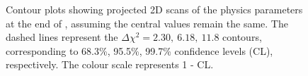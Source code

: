 \begin{figure}[h]
\centering
{}
\caption{Contour plots showing projected 2D scans of the physics parameters at the end of \runtwo, assuming the central values remain the same. The dashed lines represent the $\Delta \chi^2 = 2.30,\ 6.18,\ 11.8$ contours, corresponding to 68.3\%, 95.5\%, 99.7\% confidence levels (CL), respectively. The colour scale represents 1 - CL.}
\label{gammadiniplotsrun2}
\end{figure}

